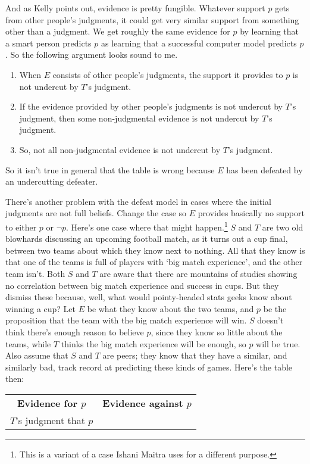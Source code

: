 And as Kelly points out, evidence is pretty fungible. Whatever support $p$ gets from other people's judgments, it could get very similar support from something other than a judgment. We get roughly the same evidence for $p$ by learning that a smart person predicts $p$ as learning that a successful computer model predicts $p$. So the following argument looks sound to me.

\begin{enumerate}
\item When $E$ consists of other people's judgments, the support it provides to $p$ is not undercut by $T$'s judgment.
\item If the evidence provided by other people's judgments is not undercut by $T$'s judgment, then some non-judgmental evidence is not undercut by $T$'s judgment.
\item So, not all non-judgmental evidence is not undercut by $T$'s judgment.
\end{enumerate}

\noindent So it isn't true in general that the table is wrong because $E$ has been defeated by an undercutting defeater.

There's another problem with the defeat model in cases where the initial judgments are not full beliefs. Change the case so $E$ provides basically no support to either $p$ or $\neg p$. Here's one case where that might happen.\footnote{This is a variant of a case Ishani Maitra uses for a different purpose.} $S$ and $T$ are two old blowhards discussing an upcoming football match, as it turns out a cup final, between two teams about which they know next to nothing. All that they know is that one of the teams is full of players with `big match experience', and the other team isn't. Both $S$ and $T$ are aware that there are mountains of studies showing no correlation between big match experience and success in cups. But they dismiss these because, well, what would pointy-headed stats geeks know about winning a cup? Let $E$ be what they know about the two teams, and $p$ be the proposition that the team with the big match experience will win. $S$ doesn't think there's enough reason to believe $p$, since they know so little about the teams, while $T$ thinks the big match experience will be enough, so $p$ will be true. Also assume that $S$ and $T$ are peers; they know that they have a similar, and similarly bad, track record at predicting these kinds of games. Here's the table then:

\begin{center}
\begin{tabular}{c c}
\textbf{Evidence for $p$} & \textbf{Evidence against $p$} \\
$T$'s judgment that $p$ & \\
\end{tabular}
\end{center}

